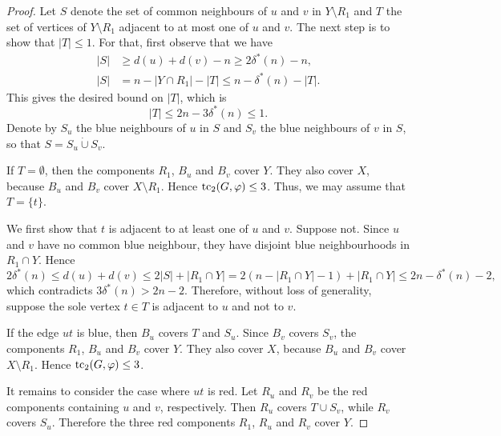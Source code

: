 \documentclass[12pt,reqno,a4paper]{amsart}
\def\tc{\mathop{\text{\rm tc}}\nolimits}
\begin{document}
\begin{proof}
Let $S$ denote the set of common neighbours of $u$ and $v$ in $Y \setminus R_1$
and $T$ the set of vertices of $Y \setminus R_1$ adjacent to at most one of $u$
and $v$. The next step is to show that $|T| \le 1$. For that, first observe
that we have
\begin{align*}
|S| &\ge d(u) + d(v) - n \ge 2\delta^*(n) - n,\\
|S| &= n - |Y \cap R_1| - |T| \le n - \delta^*(n) - |T|.
\end{align*}
This gives the desired bound on $|T|$, which is 
\begin{equation*}
|T| \le 2n - 3\delta^*(n) \le 1.
\end{equation*}
Denote by $S_u$ the blue neighbours of $u$ in $S$ and $S_v$ the blue neighbours
of $v$ in $S$, so that $S=S_u\mathbin{\dot\cup}S_v$.

If $T=\emptyset$, then the components $R_1$, $B_u$ and $B_v$ cover $Y$. They
also cover $X$, because $B_u$ and $B_v$ cover $X\setminus R_1$. Hence
$\tc_2(G,\varphi)\le 3$. Thus, we may assume that $T=\{t\}$.

We first show that $t$ is adjacent to at least one of $u$ and $v$. Suppose not.
Since $u$ and $v$ have no common blue neighbour, they have disjoint blue
neighbourhoods in $R_1\cap Y$. Hence
\[
    2\delta^*(n)\le d(u)+d(v)\le 2|S|+|R_1\cap Y|
        =2(n-|R_1\cap Y|-1)+|R_1\cap Y|
        \le 2n-\delta^*(n)-2,
\]
which contradicts $3\delta^*(n)>2n-2$. Therefore, without loss of generality,
suppose the sole vertex $t\in T$ is adjacent to $u$ and not to $v$.

If the edge $ut$ is blue, then $B_u$ covers $T$ and $S_u$. Since $B_v$ covers
$S_v$, the components $R_1$, $B_u$ and $B_v$ cover $Y$. They also cover $X$,
because $B_u$ and $B_v$ cover $X\setminus R_1$. Hence $\tc_2(G,\varphi)\le 3$.

It remains to consider the case where $ut$ is red. Let $R_u$ and $R_v$ be the
red components containing $u$ and $v$, respectively. Then $R_u$ covers
$T\cup S_v$, while $R_v$ covers $S_u$. Therefore the three red components
$R_1$, $R_u$ and $R_v$ cover $Y$.


\end{proof}
\end{document}
